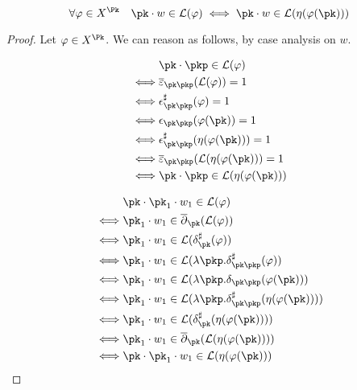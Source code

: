 \begin{lemma}\label{lem:stringvector}
\[\forall \varphi\in X^\Pk\quad  \pk\cdot w \in \mathcal L ( \varphi) \iff  \pk\cdot w \in \mathcal L ( \eta(\varphi(\pk)))\]
\end{lemma}
\begin{proof}
Let $\varphi\in X^\Pk$. We can reason as follows, by case analysis on $w$.

\medskip
\noindent{}
\begin{align*}
&\pk\cdot \pkp \in \mathcal L ( \varphi)\\
%
\iff &\overline\varepsilon_{\pk \pkp} (\mathcal L ( \varphi))=1\\
\iff &\epsilon^\sharp_{\pk \pkp} ( \varphi)=1\\
\iff &\epsilon_{\pk \pkp} ( \varphi(\pk))=1\\
\iff &\epsilon^\sharp_{\pk \pkp} ( \eta(\varphi(\pk)))=1\\
\iff &\overline\varepsilon_{\pk \pkp} (\mathcal L  (\eta(\varphi(\pk)))=1\\
\iff  & \pk\cdot \pkp  \in \mathcal L ( \eta(\varphi(\pk)))\\
\end{align*}

\medskip
\noindent{}
\begin{align*}
&\pk\cdot \pk_1 \cdot w_1 \in \mathcal L ( \varphi)\\
%
\iff & \pk_1 \cdot w_1 \in \overline\partial_{\pk} (\mathcal L ( \varphi))\\
\iff &\pk_1 \cdot w_1 \in \mathcal L ( \delta^\sharp_{\pk} (\varphi))\\
\iff &\pk_1 \cdot w_1 \in \mathcal L ( \lambda\pkp. \delta^\sharp_{\pk\pkp} (\varphi))\\
\iff &\pk_1 \cdot w_1 \in \mathcal L ( \lambda\pkp. \delta_{\pk\pkp} (\varphi(\pk)))\\
\iff & \pk_1 \cdot w_1 \in \mathcal L ( \lambda \pkp. \delta^\sharp_{\pk \pkp}  (\eta(\varphi(\pk))))\\
\iff & \pk_1 \cdot w_1 \in \mathcal L ( \delta^\sharp_{\pk}  (\eta(\varphi(\pk))))\\
\iff & \pk_1 \cdot w_1 \in \overline\partial_{\pk} (\mathcal L  (\eta(\varphi(\pk))))\\
\iff  & \pk\cdot  \pk_1 \cdot w_1  \in \mathcal L ( \eta(\varphi(\pk)))\\
\end{align*}
\end{proof}




